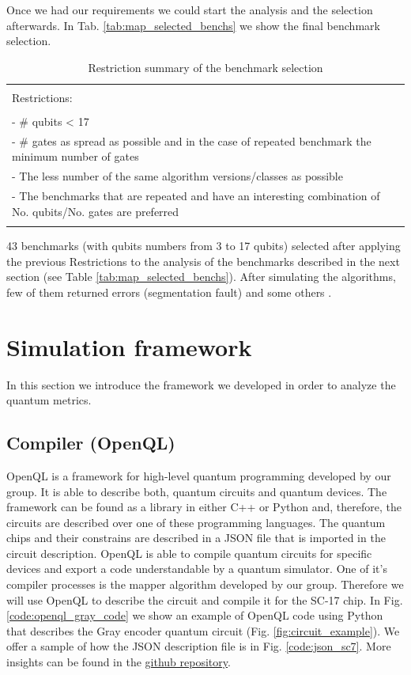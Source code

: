 Once we had our requirements we could start the analysis and the selection afterwards.
In Tab. \ref{tab:map_selected_benchs} we show the final benchmark selection.
\begin{table}[htbp]
\caption{\label{tab:org3470791}
Restriction summary of the benchmark selection}
\centering
\begin{tabular}{|l|}
\hline
\\
Restrictions:\\
\\
- \# qubits < 17\\
- \# gates as spread as possible and in the case of repeated benchmark the minimum number of gates\\
- The less number of the same algorithm versions/classes as possible\\
- The benchmarks that are repeated and have an interesting combination of No. qubits/No. gates are  preferred\\
\\
\hline
\end{tabular}
\end{table}
43 benchmarks (with qubits numbers from 3 to 17 qubits) selected after applying the previous Restrictions to the analysis of the benchmarks described in the next section (see Table \ref{tab:map_selected_benchs}).
After simulating the algorithms, few of them returned errors (segmentation fault) and some others .

\section*{Simulation framework}
\label{sec:org9506bdd}
In this section we introduce the framework we developed in order to analyze the quantum metrics.

\subsection*{Compiler (OpenQL)}
\label{sec:orgc781ca6}
OpenQL is a framework for high-level quantum programming developed by our group.
It is able to describe both, quantum circuits and quantum devices.
The framework can be found as a library in either C++ or Python and, therefore, the circuits are described over one of these programming languages.
The quantum chips and their constrains are described in a JSON file that is imported in the circuit description.
OpenQL is able to compile quantum circuits for specific devices and export a code understandable by a quantum simulator.
One of it's compiler processes is the mapper algorithm developed by our group.
Therefore we will use OpenQL to describe the circuit and compile it for the SC-17 chip.
In Fig. \ref{code:openql_gray_code} we show an example of OpenQL code using Python that describes the Gray encoder quantum circuit (Fig. \ref{fig:circuit_example}).
We offer a sample of how the JSON description file is in Fig. \ref{code:json_sc7}.
More insights can be found in the \href{https://github.com/QE-Lab/OpenQL}{github repository}.

